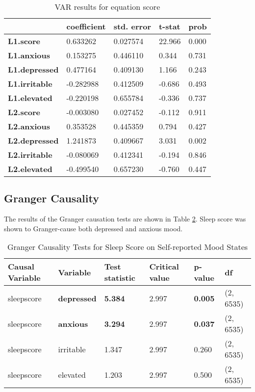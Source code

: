 \documentclass[9pt]{article}
\begin{document}
\begin{table}[hb] \centering \begin{tabular}{lllll} \toprule ~ &
  \textbf{coefficient} & \textbf{std. error} & \textbf{t-stat} & \textbf{prob}
  \\ \midrule \textbf{L1.score} & 0.633262 & 0.027574 & 22.966 & 0.000 \\
  \textbf{L1.anxious} & 0.153275 & 0.446110 & 0.344 & 0.731 \\
  \textbf{L1.depressed} & 0.477164 & 0.409130 & 1.166 & 0.243 \\
  \textbf{L1.irritable} & -0.282988 & 0.412509 & -0.686 & 0.493 \\
  \textbf{L1.elevated} & -0.220198 & 0.655784 & -0.336 & 0.737 \\
  \textbf{L2.score} & -0.003080 & 0.027452 & -0.112 & 0.911 \\
  \textbf{L2.anxious} & 0.353528 & 0.445359 & 0.794 & 0.427 \\
  \textbf{L2.depressed} & 1.241873 & 0.409667 & 3.031 & 0.002 \\
\textbf{L2.irritable} & -0.080069 & 0.412341 & -0.194 & 0.846 \\
\textbf{L2.elevated} & -0.499540 & 0.657230 & -0.760 & 0.447 \\ \bottomrule
\end{tabular} \caption{VAR results for equation score} \label{VARScoreResults}
\end{table}

\subsection{Granger Causality}\label{granger-causality-1}

The results of the Granger causation tests are shown in Table \ref{Granger}.
Sleep score was shown to Granger-cause both depressed and anxious mood.

\begin{table}[h] \centering \begin{tabular}{llllll} \toprule \textbf{Causal
  Variable} & \textbf{Variable} & \textbf{Test statistic} & \textbf{Critical
  value} & \textbf{p-value} & \textbf{df} \\ \midrule sleepscore &
  \textbf{depressed} & \textbf{5.384} & 2.997 & \textbf{0.005} & (2, 6535) \\
  sleepscore & \textbf{anxious} & \textbf{3.294} & 2.997 & \textbf{0.037} & (2,
  6535) \\ sleepscore & irritable & 1.347 & 2.997 & 0.260 & (2, 6535) \\
  sleepscore & elevated & 1.203 & 2.997 & 0.500 & (2, 6535) \\ \bottomrule
\end{tabular} \caption{Granger Causality Tests for Sleep Score on Self-reported
Mood States} \label{Granger} \end{table}
\end{document}
